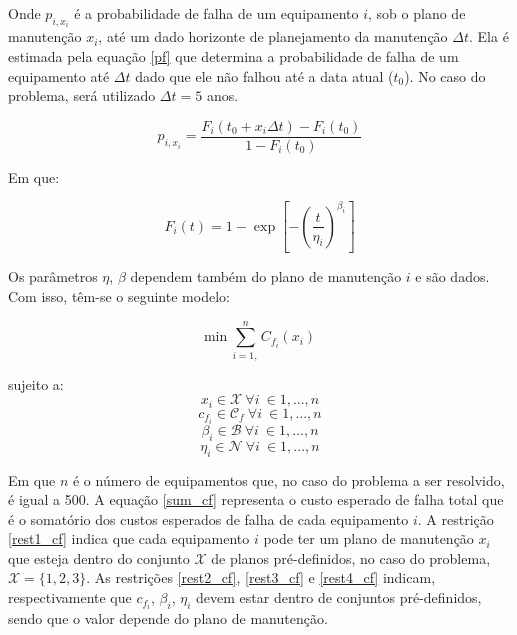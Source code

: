Onde $p_{i,x_i}$ é a probabilidade de falha de um equipamento $i$, sob o plano de manutenção $x_i$, até um dado horizonte de planejamento da manutenção $\Delta t$. Ela é estimada pela equação \ref{pf} que determina a probabilidade de falha de um equipamento até $\Delta t$ dado que ele não falhou até a data atual ($t_0$). No caso do problema, será utilizado $\Delta t = 5$ anos.

\begin{equation}
p_{i,x_i} = \frac{F_i(t_0 + x_i\Delta t) - F_i(t_0)}{1 - F_i(t_0)}
\label{pf}
\end{equation}

Em que:

\begin{equation}
F_i(t) = 1 - \exp{\left[ -{ \left( \frac{t}{\eta_i} \right) }^{\beta_i} \right]}
\end{equation}

Os parâmetros $\eta$, $\beta$ dependem também do plano de manutenção $i$ e são dados. Com isso, têm-se o seguinte modelo:

\begin{equation}
\mathrm{min}\ \sum_{i=1,}^{n} C_{f_i} (x_i) 
\label{sum_cf}
\end{equation}

sujeito a:
\begin{equation}
x_i \in \mathcal{X}\ \forall i\ \in 1, ..., n
\label{rest1_cf}
\end{equation}
\begin{equation}
c_{f_i} \in \mathcal{C}_{f}\ \forall i\ \in 1, ..., n
\label{rest2_cf}
\end{equation}
\begin{equation}
\beta_{i} \in \mathcal{B}\ \forall i\ \in 1, ..., n
\label{rest3_cf}
\end{equation}
\begin{equation}
\eta_{i} \in \mathcal{N}\ \forall i\ \in 1, ..., n
\label{rest4_cf}
\end{equation}

Em que $n$ é o número de equipamentos que, no caso do problema a ser resolvido, é igual a 500. A equação \ref{sum_cf} representa o custo esperado de falha total que é o somatório dos custos esperados de falha de cada equipamento $i$. A restrição \ref{rest1_cf} indica que cada equipamento $i$ pode ter um plano de manutenção $x_i$ que esteja dentro do conjunto $\mathcal{X}$ de planos pré-definidos, no caso do problema, $\mathcal{X} = \{1,2,3\}$. As restrições \ref{rest2_cf}, \ref{rest3_cf} e \ref{rest4_cf} indicam, respectivamente que $c_{f_i}$, $\beta_i$, $\eta_i$ devem estar dentro de conjuntos pré-definidos, sendo que o valor depende do plano de manutenção.

